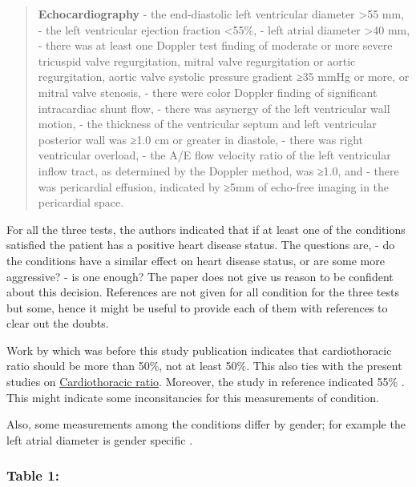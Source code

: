 \documentclass[11pt]{article}
\begin{document}
\begin{quote}
\textbf{Echocardiography} - the end-diastolic left ventricular diameter
\textgreater55 mm, - the left ventricular ejection fraction
\textless55\%, - left atrial diameter \textgreater40 mm, - there was at
least one Doppler test finding of moderate or more severe tricuspid
valve regurgitation, mitral valve regurgitation or aortic regurgitation,
aortic valve systolic pressure gradient ≥35 mmHg or more, or mitral
valve stenosis, - there were color Doppler finding of significant
intracardiac shunt flow, - there was asynergy of the left ventricular
wall motion, - the thickness of the ventricular septum and left
ventricular posterior wall was ≥1.0 cm or greater in diastole, - there
was right ventricular overload, - the A/E flow velocity ratio of the
left ventricular inflow tract, as determined by the Doppler method, was
≥1.0, and - there was pericardial effusion, indicated by ≥5mm of
echo-free imaging in the pericardial space.
\end{quote}

For all the three tests, the authors indicated that if at least one of
the conditions satisfied the patient has a positive heart disease
status. The questions are, - do the conditions have a similar effect on
heart disease status, or are some more aggressive? - is one enough? The
paper does not give us reason to be confident about this decision.
References are not given for all condition for the three tests but some,
hence it might be useful to provide each of them with references to
clear out the doubts.

Work by \cite{4980048/YR9EL6LB} which was before this study publication
indicates that cardiothoracic ratio should be more than 50\%, not at
least 50\%. This also ties with the present studies on
\href{https://radiopaedia.org/articles/cardiothoracic-ratio\#:~:text=The\%20cardiothoracic\%20ratio\%20is\%20measured,usually\%20deemed\%20to\%20be\%20pathologic.}{Cardiothoracic
ratio}. Moreover, the study in reference indicated 55\%
\cite{4980048/V78FUCB9}. This might indicate some inconsitancies for
this measurements of condition.

Also, some measurements among the conditions differ by gender; for
example the left atrial diameter is gender specific
\cite{4980048/57GL9ZHD}.

    \hypertarget{table-1}{%
\subsubsection{\texorpdfstring{\textbf{Table
1:}}{Table 1:}}\label{table-1}}
\end{document}
